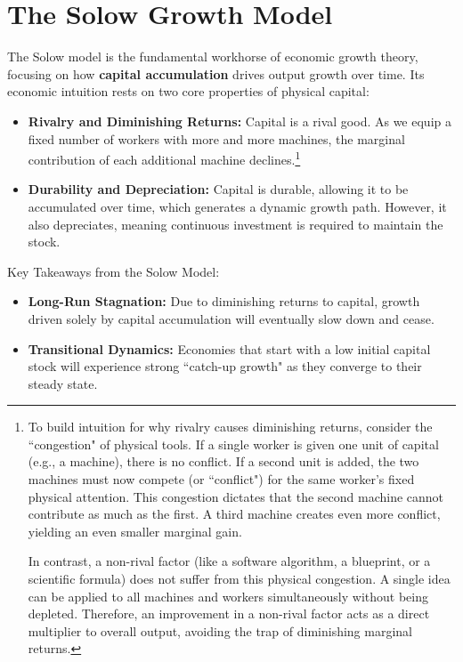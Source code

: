 \chapter{The Solow Growth Model}

The Solow model is the fundamental workhorse of economic growth theory, focusing on how \textbf{capital accumulation} drives output growth over time. Its economic intuition rests on two core properties of physical capital:
\begin{itemize}
    \item \textbf{Rivalry and Diminishing Returns:} Capital is a rival good. As we equip a fixed number of workers with more and more machines, the marginal contribution of each additional machine declines.\footnote{
        To build intuition for why rivalry causes diminishing returns, consider the ``congestion" of physical tools. If a single worker is given one unit of capital (e.g., a machine), there is no conflict. If a second unit is added, the two machines must now compete (or ``conflict") for the same worker's fixed physical attention. This congestion dictates that the second machine cannot contribute as much as the first. A third machine creates even more conflict, yielding an even smaller marginal gain. 

In contrast, a non-rival factor (like a software algorithm, a blueprint, or a scientific formula) does not suffer from this physical congestion. A single idea can be applied to all machines and workers simultaneously without being depleted. Therefore, an improvement in a non-rival factor acts as a direct multiplier to overall output, avoiding the trap of diminishing marginal returns.
    }
    \item \textbf{Durability and Depreciation:} Capital is durable, allowing it to be accumulated over time, which generates a dynamic growth path. However, it also depreciates, meaning continuous investment is required to maintain the stock.
\end{itemize}

\noindent Key Takeaways from the Solow Model:
\begin{itemize}
    \item \textbf{Long-Run Stagnation:} Due to diminishing returns to capital, growth driven solely by capital accumulation will eventually slow down and cease.
    \item \textbf{Transitional Dynamics:} Economies that start with a low initial capital stock will experience strong ``catch-up growth" as they converge to their steady state.
\end{itemize}

